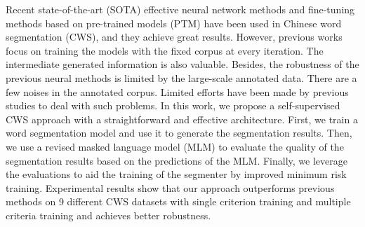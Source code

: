 Recent state-of-the-art (SOTA) effective neural network methods and fine-tuning methods based on pre-trained models (PTM) have been used in Chinese word segmentation (CWS), and they achieve great results. However, previous works focus on training the models with the fixed corpus at every iteration. The intermediate generated information is also valuable. Besides, the robustness of the previous neural methods is limited by the large-scale annotated data. There are a few noises in the annotated corpus. Limited efforts have been made by previous studies to deal with such problems. In this work, we propose a self-supervised CWS approach with a straightforward and effective architecture. First, we train a word segmentation model and use it to generate the segmentation results. Then, we use a revised masked language model (MLM) to evaluate the quality of the segmentation results based on the predictions of the MLM. Finally, we leverage the evaluations to aid the training of the segmenter by improved minimum risk training. Experimental results show that our approach outperforms previous methods on 9 different CWS datasets with single criterion training and multiple criteria training and achieves better robustness.
